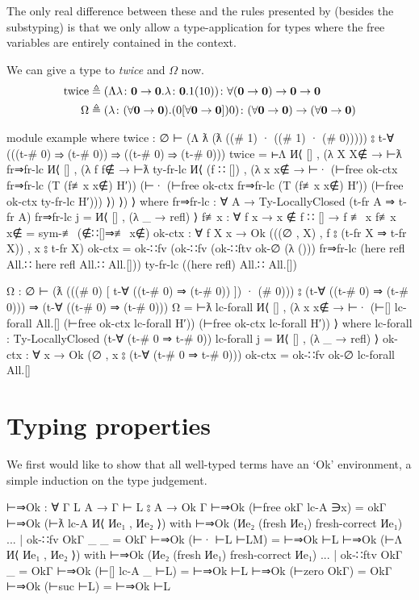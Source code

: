 \documentclass[logo,bsc,singlespacing,parskip,online]{infthesis}
\begin{document}
The only real difference between these and the rules presented by \citet{chargueraud_locally_2012}
(besides the substyping) is that we only allow a type-application for types where the free variables
are entirely contained in the context.

We can give a type to \textit{twice} and $\Omega$ now.
\begin{align}
\label{equation:twice_big_omega}
  \text{twice} &\triangleq (\Lambda \lambda \colon \mathbf{0} \to \mathbf{0}. \lambda \colon \mathbf{0}. 1(10))
    \colon \forall (\mathbf{0} \to \mathbf{0}) \to \mathbf{0} \to \mathbf{0}\\
  \Omega &\triangleq (\lambda \colon (\forall \mathbf{0} \to \mathbf{0}). (0 [\forall \mathbf{0} \to \mathbf{0}]) 0)
    \colon (\forall \mathbf{0} \to \mathbf{0}) \to (\forall \mathbf{0} \to \mathbf{0}) \notag
\end{align}
\begin{code}
  module example where
    twice : ∅ ⊢ (Λ ƛ (ƛ ((# 1) · ((# 1) · (# 0)))))
        ⦂ t-∀ (((t-# 0) ⇒ (t-# 0))
          ⇒ ((t-# 0) ⇒ (t-# 0)))
    twice = ⊢Λ И⟨ [] , (λ X {X∉} → ⊢ƛ fr⇒fr-lc И⟨ [] , (λ f {f∉} →
      ⊢ƛ ty-fr-lc И⟨ (f ∷ []) , (λ x {x∉} → ⊢·
        (⊢free ok-ctx fr⇒fr-lc (T (f≢x x∉) H′))
        (⊢·
          (⊢free ok-ctx fr⇒fr-lc (T (f≢x x∉) H′))
          (⊢free ok-ctx ty-fr-lc H′))) ⟩) ⟩) ⟩
      where
        fr⇒fr-lc : ∀ {A} → Ty-LocallyClosed (t-fr A ⇒ t-fr A)
        fr⇒fr-lc j = И⟨ [] , (λ _ → refl) ⟩
        f≢x : ∀ {f x} → x ∉ f ∷ [] → f ≢ x
        f≢x x∉ = sym-≢ (∉∷[]⇒≢ x∉)
        ok-ctx : ∀ {f X x}
          → Ok (((∅ , X) , f ⦂ (t-fr X ⇒ t-fr X)) , x ⦂ t-fr X)
        ok-ctx = ok-∷fv
                   (ok-∷fv (ok-∷ftv ok-∅ (λ ()))
                     fr⇒fr-lc
                     (here refl All.∷ here refl All.∷ All.[]))
                   ty-fr-lc
                   ((here refl) All.∷ All.[])

    Ω : ∅ ⊢ (ƛ (((# 0) [ t-∀ ((t-# 0) ⇒ (t-# 0)) ]) · (# 0)))
        ⦂ (t-∀ ((t-# 0) ⇒ (t-# 0))) ⇒ (t-∀ ((t-# 0) ⇒ (t-# 0)))
    Ω = ⊢ƛ lc-forall И⟨ [] , (λ x {x∉} →
      ⊢·
        (⊢[] lc-forall All.[] (⊢free ok-ctx lc-forall H′))
        (⊢free ok-ctx lc-forall H′)) ⟩
      where
        lc-forall : Ty-LocallyClosed (t-∀ (t-# 0 ⇒ t-# 0))
        lc-forall j = И⟨ [] , (λ _ → refl) ⟩
        ok-ctx : ∀ {x} →  Ok (∅ , x ⦂ (t-∀ (t-# 0 ⇒ t-# 0)))
        ok-ctx = ok-∷fv ok-∅ lc-forall All.[]
\end{code}

\section{Typing properties}
We first would like to show that all well-typed terms have an `Ok' environment, a simple induction
on the type judgement.
\begin{code}
  ⊢⇒Ok : ∀ {Γ L A} → Γ ⊢ L ⦂ A → Ok Γ
  ⊢⇒Ok (⊢free okΓ lc-A ∋x) = okΓ
  ⊢⇒Ok (⊢ƛ lc-A И⟨ Иe₁ , Иe₂ ⟩)
    with ⊢⇒Ok (Иe₂ (fresh Иe₁) {fresh-correct Иe₁})
  ... | ok-∷fv OkΓ _ _ = OkΓ
  ⊢⇒Ok (⊢· ⊢L ⊢LM) = ⊢⇒Ok ⊢L
  ⊢⇒Ok (⊢Λ И⟨ Иe₁ , Иe₂ ⟩)
    with ⊢⇒Ok (Иe₂ (fresh Иe₁) {fresh-correct Иe₁})
  ... | ok-∷ftv OkΓ _ = OkΓ
  ⊢⇒Ok (⊢[] lc-A _ ⊢L) = ⊢⇒Ok ⊢L
  ⊢⇒Ok (⊢zero OkΓ) = OkΓ
  ⊢⇒Ok (⊢suc ⊢L) = ⊢⇒Ok ⊢L
\end{code}
\end{document}
